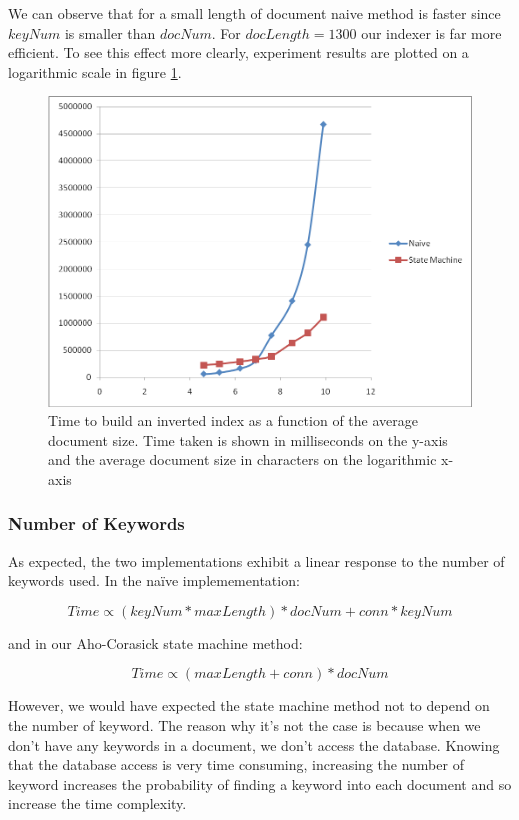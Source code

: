 \documentclass[10pt]{report}
\begin{document}
We can observe that for a small length of document naive method is
faster since \(keyNum\) is smaller than \(docNum\). For \(docLength = 1300\)
our indexer is far more efficient. To see this effect more clearly,
experiment results are plotted on a logarithmic scale in figure
\ref{fig:naivedocumentsizelog}.

\begin{figure}[h!]
  \begin{center}
    \includegraphics[width=\textwidth,height=!]{naivedocumentsizelog}
  \end{center}
  \caption{Time to build an inverted index as a function of the
      average document size. Time taken is shown in milliseconds on the
      y-axis and the average document size in characters on the
      logarithmic x-axis}
  \label{fig:naivedocumentsizelog}
\end{figure} 


\subsubsection{Number of Keywords}
As expected, the two implementations exhibit a linear response to the
number of keywords used. In the na\"{i}ve implemementation:

\[Time \propto (keyNum * maxLength) * docNum + conn * keyNum\]

and in our Aho-Corasick state machine method: 

\[Time \propto (maxLength + conn) * docNum \]

However, we would have expected the state machine method not to depend
on the number of keyword. The reason why it’s not the case is because
when we don’t have any keywords in a document, we don’t access the
database. Knowing that the database access is very time consuming,
increasing the number of keyword increases the probability of finding a
keyword into each document and so increase the time complexity.  
\end{document}
